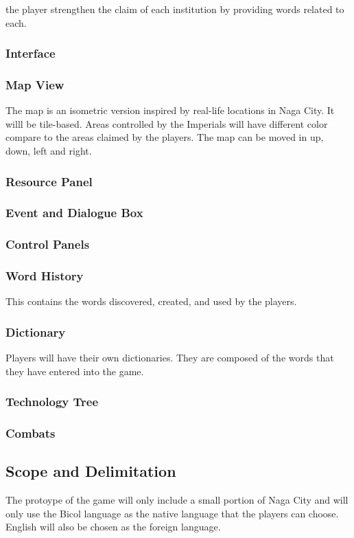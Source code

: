 \documentclass[11pt]{article}
\begin{document}
the player strengthen the claim of each institution by providing words related to each.

\subsubsection{Interface}

\subsubsection{Map View}
The map is an isometric version inspired by real-life locations in Naga City. It willl be tile-based. Areas controlled by the Imperials will have different color compare to the areas claimed by the players. The map can be moved in up, down, left and right.

\subsubsection{Resource Panel}
\subsubsection{Event and Dialogue Box}
\subsubsection{Control Panels}
\subsubsection{Word History}
This contains the words discovered, created, and used by the players.

\subsubsection{Dictionary}
Players will have their own dictionaries. They are composed of the words that they have entered into the game.

\subsubsection{Technology Tree}

\subsubsection{Combats}



\subsection{Scope and Delimitation}
The protoype of the game will only include a small portion of Naga City and will only use the Bicol language as the native language that the players can choose. English will also be chosen as the foreign language.
\end{document}
